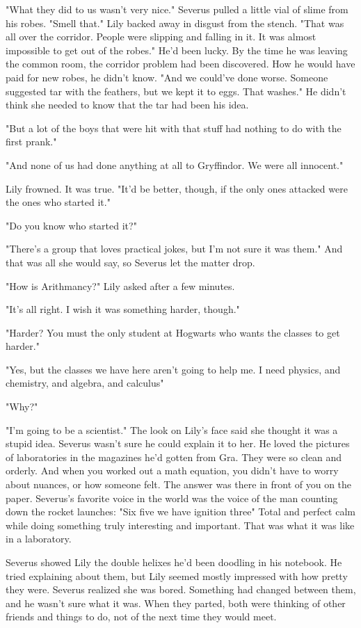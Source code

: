 "What they did to us wasn't very nice." Severus pulled a little vial of slime from his robes. "Smell that." Lily backed away in disgust from the stench. "That was all over the corridor. People were slipping and falling in it. It was almost impossible to get out of the robes." He'd been lucky. By the time he was leaving the common room, the corridor problem had been discovered. How he would have paid for new robes, he didn't know. "And we could've done worse. Someone suggested tar with the feathers, but we kept it to eggs. That washes." He didn't think she needed to know that the tar had been his idea.

"But a lot of the boys that were hit with that stuff had nothing to do with the first prank."

"And none of us had done anything at all to Gryffindor. We were all innocent."

Lily frowned. It was true. "It'd be better, though, if the only ones attacked were the ones who started it."

"Do you know who started it?"

"There's a group that loves practical jokes, but I'm not sure it was them." And that was all she would say, so Severus let the matter drop.

"How is Arithmancy?" Lily asked after a few minutes.

"It's all right. I wish it was something harder, though."

"Harder? You must the only student at Hogwarts who wants the classes to get harder."

"Yes, but the classes we have here aren't going to help me. I need physics, and chemistry, and algebra, and calculus{\el}"

"Why?"

"I'm going to be a scientist." The look on Lily's face said she thought it was a stupid idea. Severus wasn't sure he could explain it to her. He loved the pictures of laboratories in the magazines he'd gotten from Gra. They were so clean and orderly. And when you worked out a math equation, you didn't have to worry about nuances, or how someone felt. The answer was there in front of you on the paper. Severus's favorite voice in the world was the voice of the man counting down the rocket launches: "Six{\el} five{\el} we have ignition{\el} three{\el}" Total and perfect calm while doing something truly interesting and important. That was what it was like in a laboratory.

Severus showed Lily the double helixes he'd been doodling in his notebook. He tried explaining about them, but Lily seemed mostly impressed with how pretty they were. Severus realized she was bored. Something had changed between them, and he wasn't sure what it was. When they parted, both were thinking of other friends and things to do, not of the next time they would meet.

